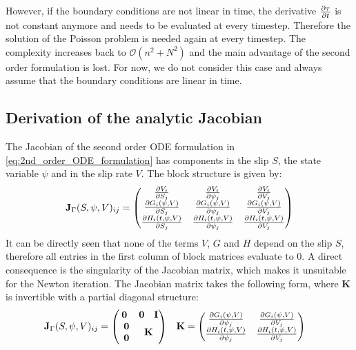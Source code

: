 However, if the boundary conditions are not linear in time, the derivative $\pdv{\tau}{t}$ is not constant anymore and needs to be evaluated at every timestep. Therefore the solution of the Poisson problem is needed again at every timestep. The complexity increases back to $\mathcal{O}\left(n^2+N^2\right)$ and the main advantage of the second order formulation is lost. For now, we do not consider this case and always assume that the boundary conditions are linear in time.  \\

\subsection{Derivation of the analytic Jacobian}
The Jacobian of the second order ODE formulation in \autoref{eq:2nd_order_ODE_formulation} has components in the slip $S$, the state variable $\psi$ and in the slip rate $V$. The block structure is given by:
\begin{equation}
\label{eq:Jacobian_2nd_order_ODE_formulation}
	\mathbf{J}_\Gamma(S,\psi,V)_{ij} = 	\begin{pmatrix}
	\pdv{V_i}{S_j} 				& \pdv{V_i}{\psi_j}	 			& \pdv{V_i}{V_j} \\
	\pdv{G_i(\psi,V)}{S_j} 		& \pdv{G_i(\psi,V)}{\psi_j}	 	& \pdv{G_i(\psi,V)}{V_j} \\
	\pdv{H_i(t,\psi,V)}{S_j} 	& \pdv{H_i(t,\psi,V)}{\psi_j} 	& \pdv{H_i(t,\psi,V)}{V_j}
\end{pmatrix}
\end{equation}
It can be directly seen that none of the terms $V$, $G$ and $H$ depend on the slip $S$, therefore all entries in the first column of block matrices evaluate to 0. A direct consequence is the singularity of the Jacobian matrix, which makes it unsuitable for the Newton iteration. The Jacobian matrix takes the following form, where $\mathbf{K}$ is invertible with a partial diagonal structure:
\begin{align}
\label{eq:Jacobian_2nd_order_ODE_formulation_with_zeros}
\mathbf{J}_\Gamma(S,\psi,V)_{ij} &= 	\begin{pmatrix}
\mathbf{0} 												& \begin{matrix}\mathbf{0} & \mathbf{I} \end{matrix} \\
\;\,\begin{matrix}\mathbf{0} \\ \mathbf{0} \end{matrix} & \mathbf{K} 	\\
\end{pmatrix} & 
\mathbf{K} &= \begin{pmatrix}
	\pdv{G_i(\psi,V)}{\psi_j}	 	& \pdv{G_i(\psi,V)}{V_j} \\
	\pdv{H_i(t,\psi,V)}{\psi_j} 	& \pdv{H_i(t,\psi,V)}{V_j}
\end{pmatrix} 
\end{align} 

